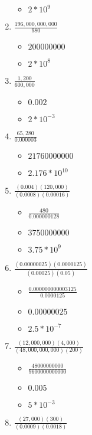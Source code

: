 \begin{enumerate}
\begin{itemize}
  \item $2 * 10^{9}$
  \end{itemize}
\item {\Large $\frac{196,000,000,000}{980}$}
  \begin{itemize}
  \item $200000000$
  \item $2 * 10^{8}$
  \end{itemize}
\item {\Large $\frac{1,200}{600,000}$}
  \begin{itemize}
  \item $0.002$
  \item $2 * 10^{-3}$
  \end{itemize}
\item {\Large $\frac{65,280}{0.000003}$}
  \begin{itemize}
  \item $21760000000$
  \item $2.176 * 10^{10}$
  \end{itemize}
\item {\Large $\frac{(0.004)(120,000)}{(0.0008)(0.00016)}$}
  \begin{itemize}
  \item {\Large $\frac{480}{0.000000128}$}
  \item $3750000000$
  \item $3.75 * 10^{9}$
  \end{itemize}
\item {\Large $\frac{(0.00000025)(0.0000125)}{(0.00025)(0.05)}$}
  \begin{itemize}
  \item {\Large $\frac{0.000000000003125}{0.0000125}$}
  \item $0.00000025$
  \item $2.5 * 10^{-7}$
  \end{itemize}
\item {\Large $\frac{(12,000,000)(4,000)}{(48,000,000,000)(200)}$}
  \begin{itemize}
  \item {\Large $\frac{48000000000}{9600000000000}$}
  \item $0.005$
  \item $5 * 10^{-3}$
  \end{itemize}
\item {\Large $\frac{(27,000)(300)}{(0.0009)(0.0018)}$}
  \begin{itemize}

\end{itemize}
\end{enumerate}
